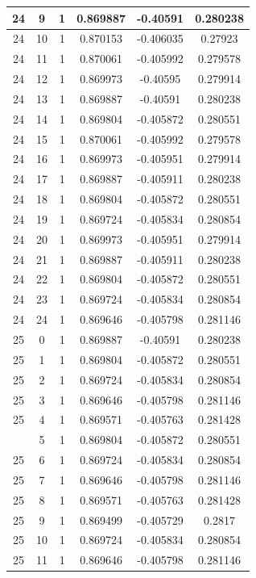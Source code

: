 \documentclass[12pt,a4paper]{article}
\numberwithin{equation}{section}
\numberwithin{figure}{section}
\numberwithin{table}{section}
\begin{document}
\begin{longtable}{|c|c|c|c|c|c|}
24 & 9 & 1 & 0.869887 & -0.40591 & 0.280238 \\ \hline
24 & 10 & 1 & 0.870153 & -0.406035 & 0.27923 \\ \hline
24 & 11 & 1 & 0.870061 & -0.405992 & 0.279578 \\ \hline
24 & 12 & 1 & 0.869973 & -0.40595 & 0.279914 \\ \hline
24 & 13 & 1 & 0.869887 & -0.40591 & 0.280238 \\ \hline
24 & 14 & 1 & 0.869804 & -0.405872 & 0.280551 \\ \hline
24 & 15 & 1 & 0.870061 & -0.405992 & 0.279578 \\ \hline
24 & 16 & 1 & 0.869973 & -0.405951 & 0.279914 \\ \hline
24 & 17 & 1 & 0.869887 & -0.405911 & 0.280238 \\ \hline
24 & 18 & 1 & 0.869804 & -0.405872 & 0.280551 \\ \hline
24 & 19 & 1 & 0.869724 & -0.405834 & 0.280854 \\ \hline
24 & 20 & 1 & 0.869973 & -0.405951 & 0.279914 \\ \hline
24 & 21 & 1 & 0.869887 & -0.405911 & 0.280238 \\ \hline
24 & 22 & 1 & 0.869804 & -0.405872 & 0.280551 \\ \hline
24 & 23 & 1 & 0.869724 & -0.405834 & 0.280854 \\ \hline
24 & 24 & 1 & 0.869646 & -0.405798 & 0.281146 \\ \hline
25 & 0 & 1 & 0.869887 & -0.40591 & 0.280238 \\ \hline
25 & 1 & 1 & 0.869804 & -0.405872 & 0.280551 \\ \hline
25 & 2 & 1 & 0.869724 & -0.405834 & 0.280854 \\ \hline
25 & 3 & 1 & 0.869646 & -0.405798 & 0.281146 \\ \hline
25 & 4 & 1 & 0.869571 & -0.405763 & 0.281428 \\ \hline
\pagebreak
25 & 5 & 1 & 0.869804 & -0.405872 & 0.280551 \\ \hline
25 & 6 & 1 & 0.869724 & -0.405834 & 0.280854 \\ \hline
25 & 7 & 1 & 0.869646 & -0.405798 & 0.281146 \\ \hline
25 & 8 & 1 & 0.869571 & -0.405763 & 0.281428 \\ \hline
25 & 9 & 1 & 0.869499 & -0.405729 & 0.2817 \\ \hline
25 & 10 & 1 & 0.869724 & -0.405834 & 0.280854 \\ \hline
25 & 11 & 1 & 0.869646 & -0.405798 & 0.281146 \\ \hline

\end{longtable}
\end{document}
